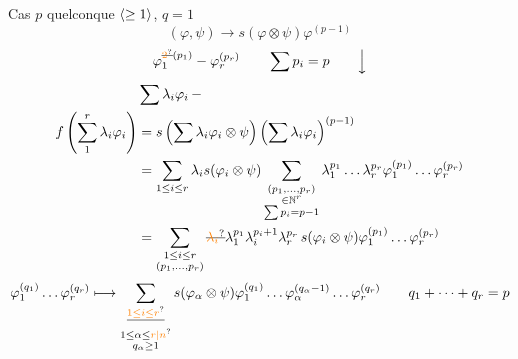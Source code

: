 Cas \(p\) quelconque \(\inserted{\geq1}\), \(q=1\)
\[
 (\varphi,\psi)\longrightarrow s(\varphi\otimes\psi)\varphi^{(p-1)}
\]
\diagram{\begin{tikzcd}[ampersand replacement=\&]
 \Gamma^{\deleted{\unsure{*}}\,\cdot+}\Phi_*\otimes
 \bigwedge^{*}_{\deleted{\unsure{*}}}\Psi_\alpha \arrow[d]\\
 \Gamma^{*+}\Phi_\alpha\otimes\bigwedge^{<}\Phi_\alpha
\end{tikzcd}}
\[
 \varphi_1^{\deleted{\unsure{2}}(p_1)}-\varphi_r^{(p_r)}
 \qquad \sum p_i=p\qquad \Big\downarrow
\]
\[
 \begin{aligned}
 &\sum\lambda_i\varphi_i\,-\\
 f\left(\sum_1^r\lambda_i\varphi_i\right)
 &=s\left(\sum\lambda_i\varphi_i\otimes\psi\right)
       \left(\sum\lambda_i\varphi_i\right)^{(p-1)}\\
 &=\sum_{1\leq i\leq r}\lambda_i s(\varphi_i\otimes\psi)
 \sum_{\substack{(p_1,\ldots,p_r)\\\in\mathbb N^r\\\sum p_i=p-1}}
 \lambda_1^{p_1}\ldots\lambda_r^{p_r}\varphi_1^{(p_1)}\ldots\varphi_r^{(p_r)}\\
 &=\sum_{\substack{1\leq i\leq r\\(p_1,\ldots,p_r)}}\deleted{\unsure{\lambda_i}}
 \lambda_1^{p_1}\lambda_i^{p_i+1}\lambda_r^{p_r}\,
 s(\varphi_i\otimes\psi)\varphi_1^{(p_1)}\ldots\varphi_r^{(p_r)}
 \end{aligned}
\]
\[
 \varphi_1^{(q_1)}\ldots\varphi_r^{(q_r)}\longmapsto
 \sum_{\substack{\deleted{\unsure{1\leq i\leq r}}\\1\leq\alpha\leq\unsure{r|n}\\q_\alpha\geq1}}
 s(\varphi_\alpha\otimes\psi)\varphi_1^{(q_1)}
 \ldots\varphi_\alpha^{(q_\alpha-1)}\ldots\varphi_r^{(q_r)}
 \qquad q_1+\cdots+q_r=p
\]
